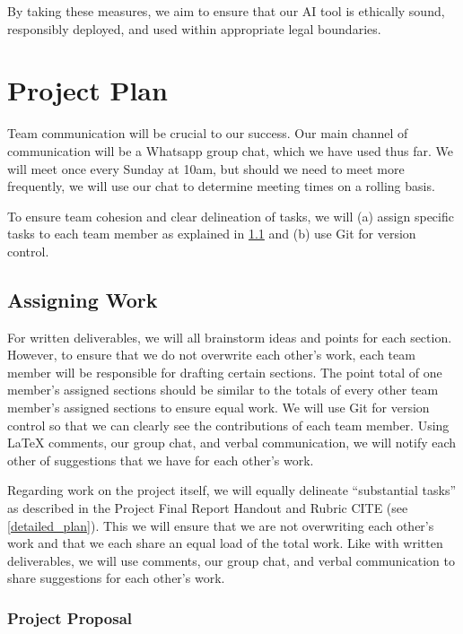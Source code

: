 \documentclass{article} %
\begin{document}
By taking these measures, we aim to ensure that our AI tool is ethically sound, responsibly deployed, and used within appropriate legal boundaries.


\section{Project Plan}
\label{plan}

Team communication will be crucial to our success. Our main channel of communication will be a Whatsapp group chat, which we have used thus far. We will meet once every Sunday at 10am, but should we need to meet more frequently, we will use our chat to determine meeting times on a rolling basis.

To ensure team cohesion and clear delineation of tasks, we will (a) assign specific tasks to each team member as explained in \ref{assigning_work} and (b) use Git for version control.

\subsection{Assigning Work}
\label{assigning_work}

For written deliverables, we will all brainstorm ideas and points for each section. However, to ensure that we do not overwrite each other's work, each team member will be responsible for drafting certain sections. The point total of one member's assigned sections should be similar to the totals of every other team member's assigned sections to ensure equal work. We will use Git for version control so that we can clearly see the contributions of each team member. Using LaTeX comments, our group chat, and verbal communication, we will notify each other of suggestions that we have for each other's work.

Regarding work on the project itself, we will equally delineate ``substantial tasks'' as described in the Project Final Report Handout and Rubric CITE (see \ref{detailed_plan}). This we will ensure that we are not overwriting each other's work and that we each share an equal load of the total work. Like with written deliverables, we will use comments, our group chat, and verbal communication to share suggestions for each other's work.

\subsubsection{Project Proposal}
\end{document}
